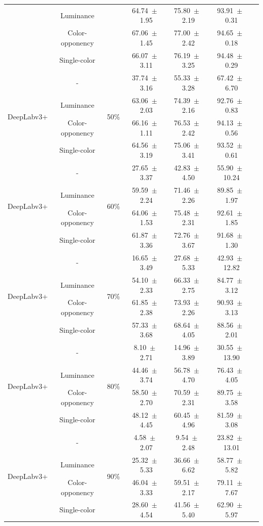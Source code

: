\begin{table}[h]
\begin{tabular}{@{}lccc ccc@{}}
& Luminance & & 64.74~$\pm$~1.95 & 75.80~$\pm$~2.19 & 93.91~$\pm$~0.31 \\
& Color-opponency & & 67.06~$\pm$~1.45 & 77.00~$\pm$~2.42 & 94.65~$\pm$~0.18 \\
& Single-color & & 66.07~$\pm$~3.11 & 76.19~$\pm$~3.25 & 94.48~$\pm$~0.29 \\
\midrule
\multirow{4}{*}{DeepLabv3+} & - & \multirow{4}{*}{50\%} & 37.74~$\pm$~3.16 & 55.33~$\pm$~3.28 & 67.42~$\pm$~6.70 \\
& Luminance & & 63.06~$\pm$~2.03 & 74.39~$\pm$~2.16 & 92.76~$\pm$~0.83 \\
& Color-opponency & & 66.16~$\pm$~1.11 & 76.53~$\pm$~2.42 & 94.13~$\pm$~0.56 \\
& Single-color & & 64.56~$\pm$~3.19 & 75.06~$\pm$~3.41 & 93.52~$\pm$~0.61 \\
\midrule
\multirow{4}{*}{DeepLabv3+} & - & \multirow{4}{*}{60\%} & 27.65~$\pm$~3.37 & 42.83~$\pm$~4.50 & 55.90~$\pm$~10.24 \\
& Luminance & & 59.59~$\pm$~2.24 & 71.46~$\pm$~2.26 & 89.85~$\pm$~1.97 \\
& Color-opponency & & 64.06~$\pm$~1.53 & 75.48~$\pm$~2.31 & 92.61~$\pm$~1.85 \\
& Single-color & & 61.87~$\pm$~3.36 & 72.76~$\pm$~3.67 & 91.68~$\pm$~1.30 \\
\midrule
\multirow{4}{*}{DeepLabv3+} & - & \multirow{4}{*}{70\%} & 16.65~$\pm$~3.49 & 27.68~$\pm$~5.33 & 42.93~$\pm$~12.82 \\
& Luminance & & 54.10~$\pm$~2.33 & 66.33~$\pm$~2.75 & 84.77~$\pm$~3.12 \\
& Color-opponency & & 61.85~$\pm$~2.38 & 73.93~$\pm$~2.26 & 90.93~$\pm$~3.13 \\
& Single-color & & 57.33~$\pm$~3.68 & 68.64~$\pm$~4.05 & 88.56~$\pm$~2.01 \\
\midrule
\multirow{4}{*}{DeepLabv3+} & - & \multirow{4}{*}{80\%} & 8.10~$\pm$~2.71 & 14.96~$\pm$~3.89 & 30.55~$\pm$~13.90 \\
& Luminance & & 44.46~$\pm$~3.74 & 56.78~$\pm$~4.70 & 76.43~$\pm$~4.05 \\
& Color-opponency & & 58.50~$\pm$~2.70 & 70.59~$\pm$~2.31 & 89.75~$\pm$~3.58 \\
& Single-color & & 48.12~$\pm$~4.45 & 60.45~$\pm$~4.96 & 81.59~$\pm$~3.08 \\
\midrule
\multirow{4}{*}{DeepLabv3+} & - & \multirow{4}{*}{90\%} & 4.58~$\pm$~2.07 & 9.54~$\pm$~2.48 & 23.82~$\pm$~13.01 \\
& Luminance & & 25.32~$\pm$~5.33 & 36.66~$\pm$~6.62 & 58.77~$\pm$~5.82 \\
& Color-opponency & & 46.04~$\pm$~3.33 & 59.51~$\pm$~2.17 & 79.11~$\pm$~7.67 \\
& Single-color & & 28.60~$\pm$~4.54 & 41.56~$\pm$~5.40 & 62.90~$\pm$~5.97 \\
\midrule
\bottomrule
\end{tabular}
\label{tab:sparse_results_deeplabv3plus_cityscapes}
\end{table}